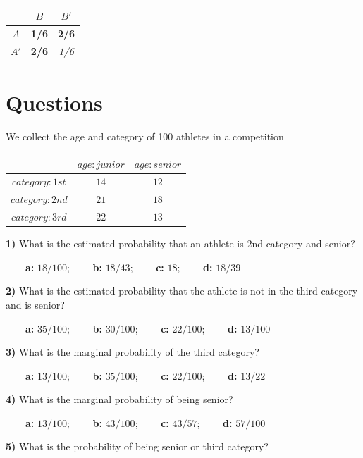\documentclass[
]{book}
\begin{document}
\begin{longtable}[]{@{}ccc@{}}
\toprule\noalign{}
& \(B\) & \(B'\) \\
\midrule\noalign{}
\endhead
\bottomrule\noalign{}
\endlastfoot
\(A\) & \textbf{1/6} & \textbf{2/6} \\
\(A'\) & \textbf{2/6} & \emph{1/6} \\
\end{longtable}

\hypertarget{questions-1}{%
\section{Questions}\label{questions-1}}

We collect the age and category of 100 athletes in a competition

\begin{longtable}[]{@{}ccc@{}}
\toprule\noalign{}
& \(age:junior\) & \(age:senior\) \\
\midrule\noalign{}
\endhead
\bottomrule\noalign{}
\endlastfoot
\(category:1st\) & \(14\) & \(12\) \\
\(category:2nd\) & \(21\) & \(18\) \\
\(category:3rd\) & \(22\) & \(13\) \\
\end{longtable}

\textbf{1)} What is the estimated probability that an athlete is 2nd category and senior?

\textbf{\(\qquad\)a:} \(18/100\); \textbf{\(\qquad\)b:} \(18/43\); \textbf{\(\qquad\)c:} \(18\); \textbf{\(\qquad\)d:} \(18/39\)

\textbf{2)} What is the estimated probability that the athlete is not in the third category and is senior?

\textbf{\(\qquad\)a:} \(35/100\); \textbf{\(\qquad\)b:} \(30/100\); \textbf{\(\qquad\)c:} \(22/100\); \textbf{\(\qquad\)d:} \(13/100\)

\textbf{3)} What is the marginal probability of the third category?

\textbf{\(\qquad\)a:} \(13/100\); \textbf{\(\qquad\)b:} \(35/100\); \textbf{\(\qquad\)c:} \(22/100\); \textbf{\(\qquad\)d:} \(13/22\)

\textbf{4)} What is the marginal probability of being senior?

\textbf{\(\qquad\)a:} \(13/100\); \textbf{\(\qquad\)b:} \(43/100\); \textbf{\(\qquad\)c:} \(43/57\); \textbf{\(\qquad\)d:} \(57/100\)

\textbf{5)} What is the probability of being senior or third category?
\end{document}
